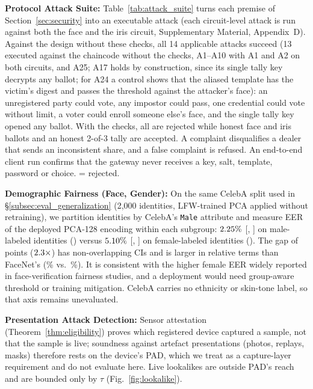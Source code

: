 \documentclass[10pt,letterpaper,journal]{IEEEtran}
\newcommand{\cmark}{\textcolor{green!60!black}{\ding{51}}}   %
\begin{document}
\textbf{Protocol Attack Suite:} Table~\ref{tab:attack_suite} turns each premise of Section~\ref{sec:security} into an executable attack (each circuit-level attack is run against both the face and the iris circuit, Supplementary Material, Appendix~D). Against the design without these checks, all 14 applicable attacks succeed (13 executed against the chaincode without the checks, A1--A10 with A1 and A2 on both circuits, and A25; A17 holds by construction, since its single tally key decrypts any ballot; for A24 a control shows that the aliased template has the victim's digest and passes the threshold against the attacker's face): an unregistered party could vote, any impostor could pass, one credential could vote without limit, a voter could enroll someone else's face, and the single tally key opened any ballot. With the checks, all \nAttacks{} are rejected while honest face and iris ballots and an honest 2-of-3 tally are accepted. A complaint disqualifies a dealer that sends an inconsistent share, and a false complaint is refused. An end-to-end client run confirms that the gateway never receives a key, salt, template, password or choice. \cmark{} = rejected.

\textbf{Demographic Fairness (Face, Gender):} On the same CelebA split used in \S\ref{subsec:eval_generalization} (2,000 identities, LFW-trained PCA applied without retraining), we partition identities by CelebA's \texttt{Male} attribute and measure EER of the deployed PCA-128 encoding within each subgroup: $2.25\%$ [\nMaleEerLo, \nMaleEerHi] on male-labeled identities (\nMaleIds) versus $5.10\%$ [\nFemaleEerLo, \nFemaleEerHi] on female-labeled identities (\nFemaleIds). The gap of \nGenderGap{} points ($2.3\times$) has non-overlapping CIs and is larger in relative terms than FaceNet's (\nFacenetMaleEer\% vs.\ \nFacenetFemaleEer\%). It is consistent with the higher female EER widely reported in face-verification fairness studies, and a deployment would need group-aware threshold or training mitigation. CelebA carries no ethnicity or skin-tone label, so that axis remains unevaluated.

\textbf{Presentation Attack Detection:} Sensor attestation (Theorem~\ref{thm:eligibility}) proves which registered device captured a sample, not that the sample is live; soundness against artefact presentations (photos, replays, masks) therefore rests on the device's PAD, which we treat as a capture-layer requirement and do not evaluate here. Live lookalikes are outside PAD's reach and are bounded only by $\tau$ (Fig.~\ref{fig:lookalike}).
\end{document}
